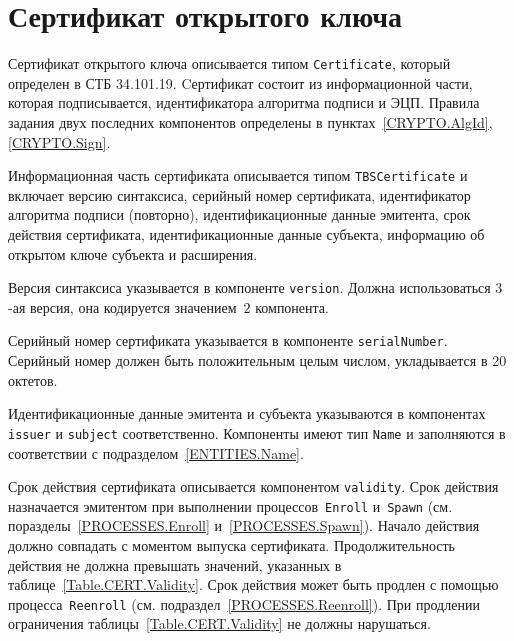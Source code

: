 \section{Сертификат открытого ключа}\label{FMT.Cert}

Сертификат открытого ключа описывается типом 
\texttt{Certificate}, который определен в СТБ 34.101.19.
%
Cертификат состоит из информационной части, которая 
подписывается, идентификатора алгоритма подписи и ЭЦП. 
Правила задания двух последних компонентов определены 
в пунктах~\ref{CRYPTO.AlgId}, \ref{CRYPTO.Sign}.

Информационная часть сертификата описывается типом 
\texttt{TBSCertificate} и включает версию синтаксиса, 
серийный номер сертификата, идентификатор алгоритма подписи (повторно), 
идентификационные данные эмитента, срок действия сертификата, 
идентификационные данные субъекта, информацию об открытом ключе 
субъекта и расширения. 

Версия синтаксиса указывается в компоненте \texttt{version}.
Должна использоваться $3$-ая версия, она кодируется значением~$2$
компонента.

Серийный номер сертификата указывается в компоненте \texttt{serialNumber}.
Серийный номер должен быть положительным целым числом, 
 укладывается в 20 октетов.

Идентификационные данные эмитента и субъекта указываются в компонентах 
\texttt{issuer} и \texttt{subject} соответственно. Компоненты 
имеют тип \texttt{Name} и заполняются в соответствии с 
подразделом~\ref{ENTITIES.Name}. 

Срок действия сертификата описывается компонентом 
\texttt{validity}. Срок действия назначается эмитентом
при выполнении процессов~\texttt{Enroll} и~\texttt{Spawn}
(см. поразделы~\ref{PROCESSES.Enroll} и~\ref{PROCESSES.Spawn}). 
Начало действия должно совпадать с моментом выпуска сертификата. 
Продолжительность действия не должна превышать значений, указанных в 
таблице~\ref{Table.CERT.Validity}. 
%
Срок действия может быть продлен с помощью процесса~\texttt{Reenroll}
(см. подраздел~\ref{PROCESSES.Reenroll}). При продлении ограничения
таблицы~\ref{Table.CERT.Validity} не должны нарушаться.

